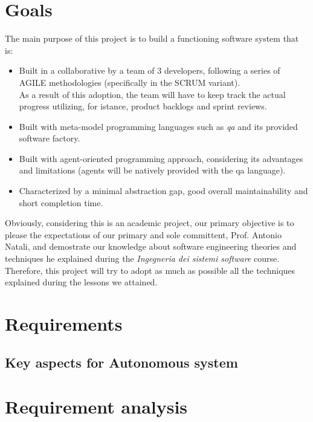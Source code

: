 \documentclass{llncs}
\newcommand{\labelsec}[1]{\label{sec:#1}}
\begin{document}
\section{Goals}
\labelsec{Goals}
The main purpose of this project is to build a functioning software system that is:
\begin{itemize}
\item Built in a collaborative by a team of 3 developers, following a series of AGILE methodologies (specifically in the SCRUM variant).\\
As a result of this adoption, the team will have to keep track the actual progress utilizing, for istance, product backlogs and sprint reviews.
\item Built with meta-model programming languages such as \textit{qa} and its provided software factory.
\item Built with agent-oriented programming approach, considering its advantages and limitations (agents will be natively provided with the qa language).
\item Characterized by a minimal abstraction gap, good overall maintainability and short completion time.\\
\end{itemize}
Obviously, considering this is an academic project, our primary objective is to please the expectations of our primary and sole committent, Prof. Antonio Natali, and demostrate our knowledge about software engineering theories and techniques he explained during the \textit{Ingegneria dei sistemi software} course.\\
Therefore, this project will try to adopt as much as possible all the techniques explained during the lessons we attained.
\newpage
\section{Requirements}
\labelsec{Requirements}
\newpage
\subsection{Key aspects for Autonomous system}
\newpage
\section{Requirement analysis}
\labelsec{ReqAnalysis}
\end{document}
